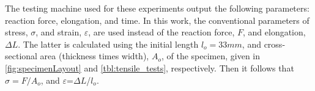 
The testing machine used for these experiments output the following parameters: reaction force, elongation, and time. In this work, the conventional parameters of stress, $\sigma$, and strain, $\varepsilon$, are used instead of the reaction force, $F$, and elongation, $\Delta L$. The latter is calculated using the initial length $l_o=33 mm$, and cross-sectional area (thickness times width), $A_o$, of the specimen, given in \autoref{fig:specimenLayout} and \autoref{tbl:tensile_tests}, respectively. Then it follows that $\sigma=F/A_o$, and $\varepsilon$=$\Delta L$/$l_o$.

